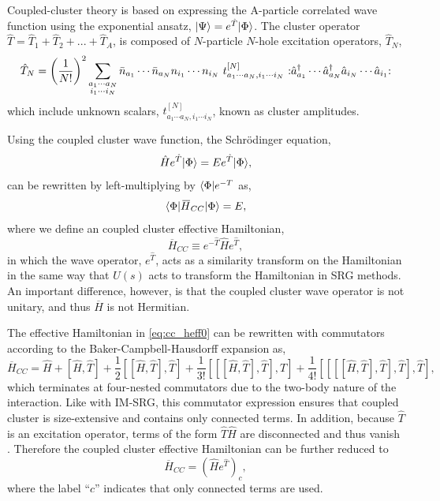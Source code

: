 Coupled-cluster theory is based on expressing the A-particle correlated wave function using the exponential ansatz, $| \Psi \rangle = e^{\hat{T}}| \Phi \rangle$.  The cluster operator $\hat{T} = \hat{T}_{1} + \hat{T}_{2} + ... + \hat{T}_{A}$, is composed of $N$-particle $N$-hole excitation operators, $\hat{T}_{N}$,
\begin{equation}\label{eq:cc_amps}
\hat{T}_{N} = \left( \frac{1}{N!} \right)^{2}\sum\limits_{\substack{a_{1} \cdots a_{N} \\ i_{1} \cdots i_{N}}} \bar{n}_{a_{1}} \cdots \bar{n}_{a_{N}} n_{i_{1}} \cdots n_{i_{N}}\ t_{a_{1} \cdots a_{N}, i_{1} \cdots i_{N}}^{[N]}\ \normord{\hat a_{a_{1}}^\dagger \cdots \hat a_{a_{N}}^\dagger \hat a_{i_{N}} \cdots \hat a_{i_{1}}}
\end{equation}
which include unknown scalars, $t_{a_{1} \cdots a_{N}, i_{1} \cdots i_{N}}^{[N]}$, known as cluster amplitudes.

Using the coupled cluster wave function, the Schr{\"o}dinger equation,
\begin{equation}\label{eq:cc_schrodeq}
\hat{H}e^{\hat{T}}| \Phi \rangle = Ee^{\hat{T}}| \Phi \rangle,
\end{equation}
can be rewritten by left-multiplying by $\langle \Phi |e^{-T}$ as,
\begin{equation}\label{eq:ccsd0}
\bra{\Phi}\overbar{H}_{CC}\ket{\Phi} = E,
\end{equation}
where we define an coupled cluster effective Hamiltonian,
\begin{equation}\label{eq:cc_heff0}
\overbar{H}_{CC} \equiv e^{-\hat{T}}\hat{H}e^{\hat{T}},
\end{equation}
in which the wave operator, $e^{\hat{T}}$, acts as a similarity transform on the Hamiltonian in the same way that $\hat{U}(s)$ acts to transform the Hamiltonian in SRG methods.  An important difference, however, is that the coupled cluster wave operator is not unitary, and thus $\overbar{H}$ is not Hermitian.

The effective Hamiltonian in \eqref{eq:cc_heff0} can be rewritten with commutators according to the Baker-Campbell-Hausdorff expansion as,
\begin{equation*}\label{eq:cc_bch}
\overbar{H}_{CC} = \hat{H} + [ \hat{H},\hat{T} ] + \frac{1}{2} [[ \hat{H},\hat{T} ],\hat{T} ] + \frac{1}{3!} [[[ \hat{H},\hat{T} ],\hat{T} ],\hat{T} ] + \frac{1}{4!} [[[[ \hat{H},\hat{T} ],\hat{T} ],\hat{T} ],\hat{T} ],
\end{equation*}
which terminates at four-nested commutators due to the two-body nature of the interaction.  Like with IM-SRG, this commutator expression ensures that coupled cluster is size-extensive and contains only connected terms.  In addition, because $\hat{T}$ is an excitation operator, terms of the form $\hat{T}\hat{H}$ are disconnected and thus vanish \cite{shavitt2009many}.  Therefore the coupled cluster effective Hamiltonian can be further reduced to
\begin{equation}\label{eq:cc_heff1}
\overbar{H}_{CC} = \left( \hat{H}e^{\hat{T}} \right)_{c},
\end{equation}
where the label ``$c$'' indicates that only connected terms are used.

